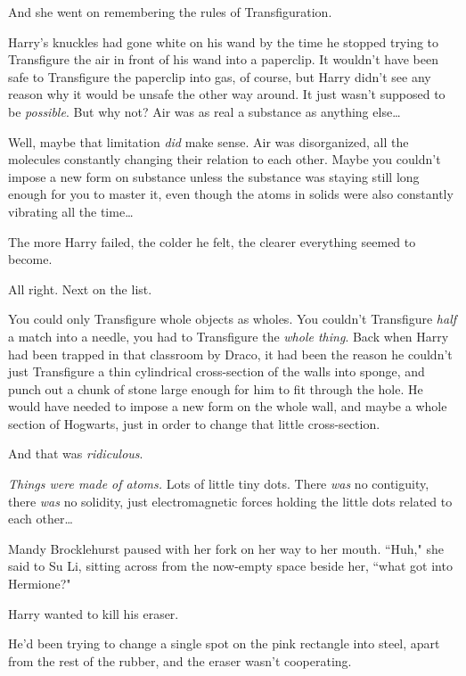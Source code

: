 And she went on remembering the rules of Transfiguration.

\later

Harry's knuckles had gone white on his wand by the time he stopped trying to Transfigure the air in front of his wand into a paperclip. It wouldn't have been safe to Transfigure the paperclip into gas, of course, but Harry didn't see any reason why it would be unsafe the other way around. It just wasn't supposed to be \emph{possible}. But why not? Air was as real a substance as anything else{\ldots}

Well, maybe that limitation \emph{did} make sense. Air was disorganized, all the molecules constantly changing their relation to each other. Maybe you couldn't impose a new form on substance unless the substance was staying still long enough for you to master it, even though the atoms in solids were also constantly vibrating all the time{\ldots}

The more Harry failed, the colder he felt, the clearer everything seemed to become.

All right. Next on the list.

You could only Transfigure whole objects as wholes. You couldn't Transfigure \emph{half} a match into a needle, you had to Transfigure the \emph{whole thing}. Back when Harry had been trapped in that classroom by Draco, it had been the reason he couldn't just Transfigure a thin cylindrical cross-section of the walls into sponge, and punch out a chunk of stone large enough for him to fit through the hole. He would have needed to impose a new form on the whole wall, and maybe a whole section of Hogwarts, just in order to change that little cross-section.

And that was \emph{ridiculous}.

\emph{Things were made of atoms.} Lots of little tiny dots. There \emph{was} no contiguity, there \emph{was} no solidity, just electromagnetic forces holding the little dots related to each other{\ldots}

\later

Mandy Brocklehurst paused with her fork on her way to her mouth. ``Huh," she said to Su Li, sitting across from the now-empty space beside her, ``what got into Hermione?"

\later

Harry wanted to kill his eraser.

He'd been trying to change a single spot on the pink rectangle into steel, apart from the rest of the rubber, and the eraser wasn't cooperating.

